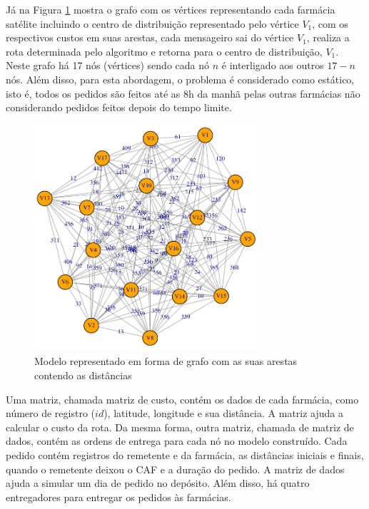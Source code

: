 Já na Figura \ref{fig:dataset-graph} mostra o grafo com os vértices representando cada farmácia satélite incluindo o centro de distribuição representado pelo vértice $V_1$, com os respectivos custos em suas arestas, cada mensageiro sai do vértice $V_1$, realiza a rota determinada pelo algoritmo e retorna para o centro de distribuição, $V_1$. Neste grafo há 17 nós (vértices) sendo cada nó $n$ é interligado aos outros $17 - n$ nós. Além disso, para esta abordagem, o problema é considerado como estático, isto é, todos os pedidos são feitos até as 8h da manhã pelas outras farmácias não considerando pedidos feitos depois do tempo limite.

\begin{figure}[htb]
    \centering
    \caption{\label{fig:dataset-graph}Modelo representado em forma de grafo com as suas arestas contendo as distâncias} 
    \includegraphics[width=0.75\textwidth]{imagens/dataset-graph.pdf}
\end{figure}

Uma matriz, chamada matriz de custo, contém os dados de cada farmácia, como número de registro ($id$), latitude, longitude e sua distância. A matriz ajuda a calcular o custo da rota. Da mesma forma, outra matriz, chamada de matriz de dados, contém as ordens de entrega para cada nó no modelo construído. Cada pedido contém registros do remetente e da farmácia, as distâncias iniciais e finais, quando o remetente deixou o CAF e a duração do pedido. A matriz de dados ajuda a simular um dia de pedido no depósito. Além disso, há quatro entregadores para entregar os pedidos às farmácias.

